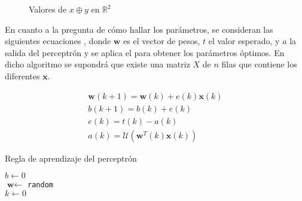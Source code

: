		\begin{figure}
			\centering
			\caption{Valores de $x \oplus y$ en  $\mathbb{R}^2$}
			\label{fig:xor}
		\end{figure}
		
		En cuanto a la pregunta de cómo hallar los parámetros, se consideran las siguientes ecuaciones \cite{nndesign}, donde $\textbf{w}$ es el vector de pesos, $t$ el valor esperado, y $a$ la salida del perceptrón y se aplica el  para obtener los parámetros óptimos. En dicho algoritmo se supondrá que existe una matriz $X$ de $n$ filas que contiene los diferentes $\textbf{x}$. 
		
		\begin{equation}
			\label{eq:perceptron}
			\begin{gathered}
				\textbf{w}(k+1) = \textbf{w}(k) + e(k)\textbf{x}(k)\\
				b(k+1) = b(k) + e(k)\\
				e(k) = t(k) - a(k)\\
				a(k) = \mathcal{U}(\textbf{w}^T(k)\textbf{x}(k))
			\end{gathered}
		\end{equation}
		
		
		\begin{algorithm}[!h]
			\DontPrintSemicolon
			
			\caption{Regla de aprendizaje del perceptrón}
			\label{algo:perceptron}
			
			$b \gets 0$\\
			$\textbf{w} \gets$ \texttt{random}\\
			$k \gets 0$\\
		\end{algorithm}
		
